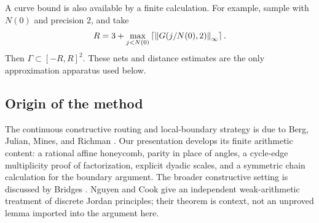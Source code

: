 A curve bound is also available by a finite calculation. For example,
sample with $N(0)$ and precision $2$, and take
\begin{equation}
 R=3+\max_{j<N(0)}\left\lceil \left\lVert G(j/N(0),2)\right\rVert_\infty\right\rceil.
 \label{eq:R}
\end{equation}
Then $\Gamma\subset[-R,R]^2$. These nets and distance estimates are the
only approximation apparatus used below.

\subsection{Origin of the method}

The continuous constructive routing and local-boundary strategy is due
to Berg, Julian, Mines, and Richman \cite{BJMR}. Our presentation develops
its finite arithmetic content: a rational affine honeycomb, parity in
place of angles, a cycle-edge multiplicity proof of factorization,
explicit dyadic scales, and a symmetric chain calculation for the
boundary argument. The broader constructive setting is discussed by
Bridges \cite{Bridges}. Nguyen and Cook \cite{NC} give an independent
weak-arithmetic treatment of discrete Jordan principles; their theorem
is context, not an unproved lemma imported into the argument here.
